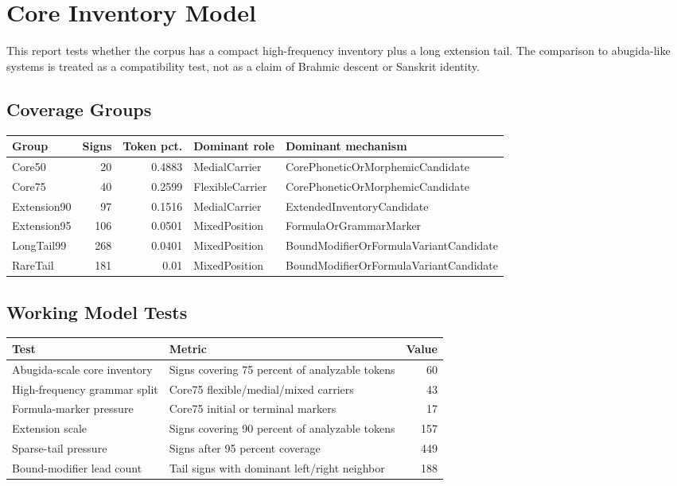 ﻿\documentclass[11pt,a4paper]{article}
\begin{document}
\section*{Core Inventory Model}
This report tests whether the corpus has a compact high-frequency inventory plus a long extension tail. The comparison to abugida-like systems is treated as a compatibility test, not as a claim of Brahmic descent or Sanskrit identity.
\subsection*{Coverage Groups}
\begin{center}
\begin{tabular}{lrrll}
\toprule
\textbf{Group} & \textbf{Signs} & \textbf{Token pct.} & \textbf{Dominant role} & \textbf{Dominant mechanism} \\
\midrule
Core50 & 20 & 0.4883 & MedialCarrier & CorePhoneticOrMorphemicCandidate \\
Core75 & 40 & 0.2599 & FlexibleCarrier & CorePhoneticOrMorphemicCandidate \\
Extension90 & 97 & 0.1516 & MedialCarrier & ExtendedInventoryCandidate \\
Extension95 & 106 & 0.0501 & MixedPosition & FormulaOrGrammarMarker \\
LongTail99 & 268 & 0.0401 & MixedPosition & BoundModifierOrFormulaVariantCandidate \\
RareTail & 181 & 0.01 & MixedPosition & BoundModifierOrFormulaVariantCandidate \\
\bottomrule
\end{tabular}
\end{center}
\subsection*{Working Model Tests}
\begin{center}
\begin{tabular}{llr}
\toprule
\textbf{Test} & \textbf{Metric} & \textbf{Value} \\
\midrule
Abugida-scale core inventory & Signs covering 75 percent of analyzable tokens & 60 \\
High-frequency grammar split & Core75 flexible/medial/mixed carriers & 43 \\
Formula-marker pressure & Core75 initial or terminal markers & 17 \\
Extension scale & Signs covering 90 percent of analyzable tokens & 157 \\
Sparse-tail pressure & Signs after 95 percent coverage & 449 \\
Bound-modifier lead count & Tail signs with dominant left/right neighbor & 188 \\
\bottomrule
\end{tabular}
\end{center}
\end{document}
